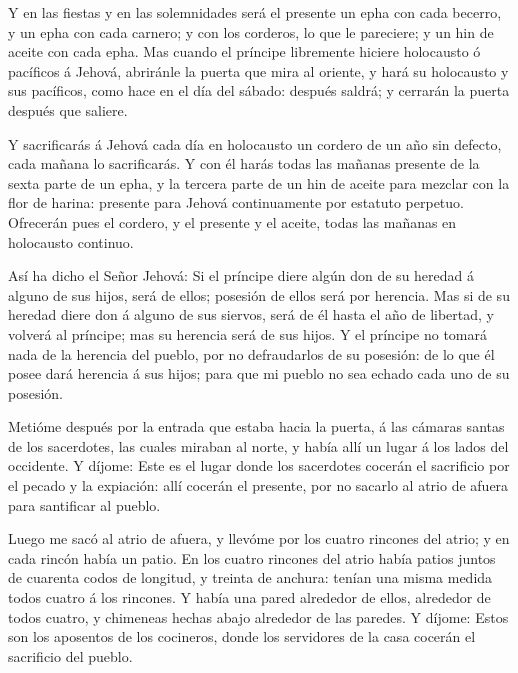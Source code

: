  Y en las fiestas y en las solemnidades será el presente un
epha con cada becerro, y un epha con cada carnero; y con los corderos,
lo que le pareciere; y un hin de aceite con cada epha.  Mas
cuando el príncipe libremente hiciere holocausto ó pacíficos á Jehová,
abriránle la puerta que mira al oriente, y hará su holocausto y sus
pacíficos, como hace en el día del sábado: después saldrá; y cerrarán la
puerta después que saliere.

 Y sacrificarás á Jehová cada día en holocausto un cordero
de un año sin defecto, cada mañana lo sacrificarás.  Y con
él harás todas las mañanas presente de la sexta parte de un epha, y la
tercera parte de un hin de aceite para mezclar con la flor de harina:
presente para Jehová continuamente por estatuto perpetuo. 
Ofrecerán pues el cordero, y el presente y el aceite, todas las mañanas
en holocausto continuo.

 Así ha dicho el Señor Jehová: Si el príncipe diere algún
don de su heredad á alguno de sus hijos, será de ellos; posesión de
ellos será por herencia.  Mas si de su heredad diere don á
alguno de sus siervos, será de él hasta el año de libertad, y volverá al
príncipe; mas su herencia será de sus hijos.  Y el príncipe
no tomará nada de la herencia del pueblo, por no defraudarlos de su
posesión: de lo que él posee dará herencia á sus hijos; para que mi
pueblo no sea echado cada uno de su posesión.

 Metióme después por la entrada que estaba hacia la puerta,
á las cámaras santas de los sacerdotes, las cuales miraban al norte, y
había allí un lugar á los lados del occidente.  Y díjome:
Este es el lugar donde los sacerdotes cocerán el sacrificio por el
pecado y la expiación: allí cocerán el presente, por no sacarlo al atrio
de afuera para santificar al pueblo.

 Luego me sacó al atrio de afuera, y llevóme por los cuatro
rincones del atrio; y en cada rincón había un patio.  En
los cuatro rincones del atrio había patios juntos de cuarenta codos de
longitud, y treinta de anchura: tenían una misma medida todos cuatro á
los rincones.  Y había una pared alrededor de ellos,
alrededor de todos cuatro, y chimeneas hechas abajo alrededor de las
paredes.  Y díjome: Estos son los aposentos de los
cocineros, donde los servidores de la casa cocerán el sacrificio del
pueblo.

